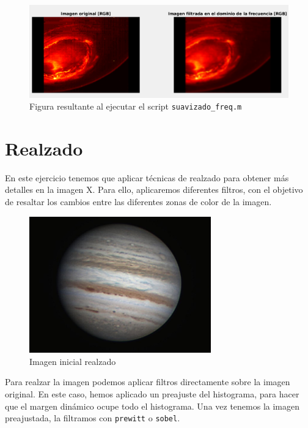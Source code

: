 \documentclass[12pt]{article}
\begin{document}
	\begin{figure}[h]
		\begin{center}
			\includegraphics[width=1\textwidth]{img/suavizado_freq.png}
			\caption{Figura resultante al ejecutar el script \texttt{suavizado\_freq.m}}
			\label{img: suavizado freq}
		\end{center}
	\end{figure}
	
	\pagebreak
	
	\section{Realzado}
	
	\noindent En este ejercicio tenemos que aplicar técnicas de realzado para obtener más detalles en la imagen X. Para ello, aplicaremos diferentes filtros, con el objetivo de resaltar los cambios entre las diferentes zonas de color de la imagen.
	
	\begin{figure}[h]
		\begin{center}
			\includegraphics[width=0.7\textwidth]{img/realzado.jpg}
			\caption{Imagen inicial realzado}
			\label{img: realzado src}
		\end{center}
	\end{figure}

	\noindent Para realzar la imagen podemos aplicar filtros directamente sobre la imagen original. En este caso, hemos aplicado un preajuste del histograma, para hacer que el margen dinámico ocupe todo el histograma. Una vez tenemos la imagen preajustada, la filtramos con \texttt{prewitt} o \texttt{sobel}.
	
\end{document}
